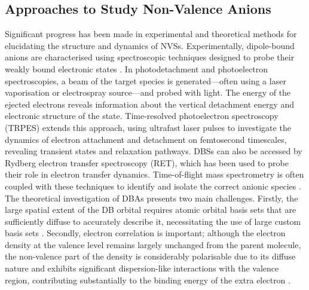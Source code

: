 \subsection{Approaches to Study Non-Valence Anions}
Significant progress has been made in experimental and theoretical methods for elucidating the structure and dynamics of NVSs. \cite{desfranccois1995determination,simons2008molecular,simons2023molecular} Experimentally, dipole-bound anions are characterised using spectroscopic techniques designed to probe their weakly bound electronic states \cite{liu2020photoelectron,rogers2019photoelectron,clarke2024dynamics}. In photodetachment and photoelectron spectroscopies, a beam of the target species is generated—often using a laser vaporisation or electrospray source—and probed with light. The energy of the ejected electrons reveals information about the vertical detachment energy and electronic structure of the state. Time-resolved photoelectron spectroscopy (TRPES)\cite{cyr1996femtosecond,neumark2001time} extends this approach, using ultrafast laser pulses to investigate the dynamics of electron attachment and detachment on femtosecond timescales, revealing transient states and relaxation pathways. DBSs can also be accessed by Rydberg electron transfer spectroscopy (RET)\cite{carles2001rydberg,eustis2007photoelectron,bradforth2002excited}, which has been used to probe their role in electron transfer dynamics. Time-of-flight mass spectrometry is often coupled with these techniques to identify and isolate the correct anionic species \cite{desfranccois1996abdoul,ameixa2023parent,pshenichnyuk2020ionizing}.\\

The theoretical investigation of DBAs presents two main challenges. Firstly, the large spatial extent of the DB orbital requires atomic orbital basis sets that are sufficiently diffuse to accurately describe it, necessitating the use of large custom basis sets \cite{skurski2000choose}. Secondly, electron correlation is important; although the electron density at the valence level remains largely unchanged from the parent molecule, the non-valence part of the density is considerably polarisable due to its diffuse nature and exhibits significant dispersion-like interactions with the valence region, contributing substantially to the binding energy of the extra electron \cite{simons2008molecular,simons2011theoretical,simons2023molecular,gutowski1996contribution,voora2017theoretical}.\\

